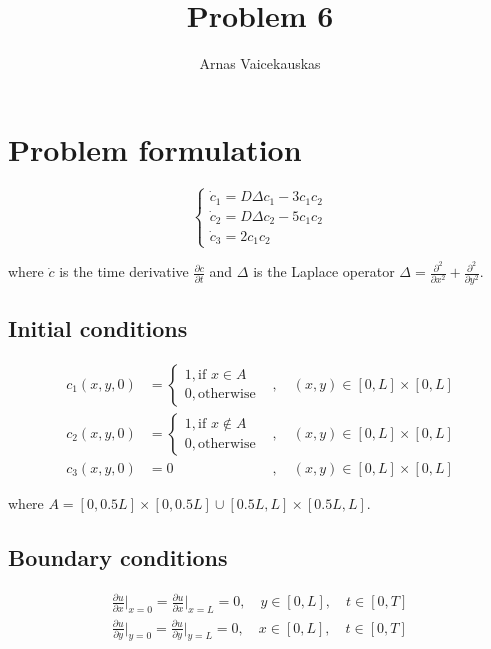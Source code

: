 \documentclass{article}
\title{Problem 6}
\author{Arnas Vaicekauskas}
\begin{document}
\maketitle

\section{Problem formulation}

\begin{equation}
    \begin{cases}
        \dot c_1=D\Delta c_1 - 3c_1c_2\\
        \dot c_2=D\Delta c_2 - 5c_1c_2\\
        \dot c_3=2c_1c_2
    \end{cases}
\end{equation}

where $\dot c$ is the time derivative $\frac{\partial c}{\partial t}$ and $\Delta$ 
is the Laplace operator $\Delta = \frac{\partial^2}{\partial x^2} + \frac{\partial^2}{\partial y^2}$.

\subsection{Initial conditions}

\begin{equation}
    \begin{aligned}
        c_1(x, y, 0) &= 
        \begin{cases}
            1, \text{if } x\in A\\
            0, \text{otherwise}
        \end{cases}&, \quad (x, y)\in[0,L]\times[0,L]\\
        c_2(x, y, 0) &= 
        \begin{cases}
            1, \text{if } x\notin A\\
            0, \text{otherwise}
        \end{cases}&, \quad (x, y)\in[0,L]\times[0,L]\\
        c_3(x, y, 0) &= 0&, \quad (x, y)\in[0,L]\times[0,L]
    \end{aligned}
\end{equation}

where $A=[0,0.5L]\times[0,0.5L]\cup[0.5L,L]\times[0.5L,L]$.

\subsection{Boundary conditions}

\begin{equation}
    \begin{split}
        \frac{\partial u}{\partial x}\Big|_{x=0}=\frac{\partial u}{\partial x}\Big|_{x=L}=0,\quad y\in[0,L],\quad t\in[0,T]\\
        \frac{\partial u}{\partial y}\Big|_{y=0}=\frac{\partial u}{\partial y}\Big|_{y=L}=0,\quad x\in[0,L],\quad t\in[0,T]\\
    \end{split}
\end{equation}
\end{document}
